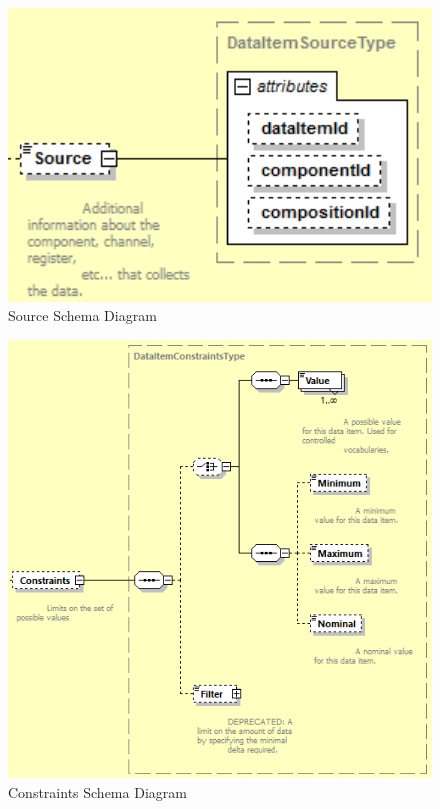 \begin{figure}[ht]
  \centering
    \includegraphics[width=1.0\textwidth]{figures/Source Schema.png}
  \caption{Source Schema Diagram}
  \label{fig:Source Schema Diagram}
\end{figure}

\FloatBarrier


\begin{figure}[ht]
  \centering
    \includegraphics[width=1.0\textwidth]{figures/Constraints Schema.png}
  \caption{Constraints Schema Diagram}
  \label{fig:Constraints Schema Diagram}
\end{figure}


